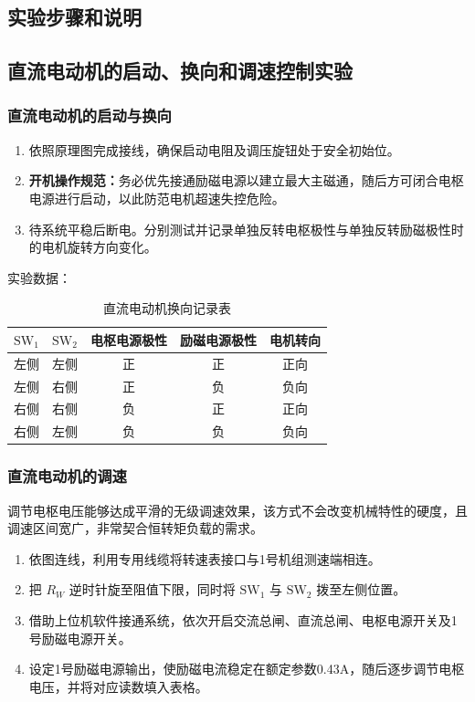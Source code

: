 \begin{framed}
{			\section{实验步骤和说明}
			
			\subsection{直流电动机的启动、换向和调速控制实验}
			
			\subsubsection{直流电动机的启动与换向}
			\begin{enumerate}
				\item 依照原理图完成接线，确保启动电阻及调压旋钮处于安全初始位。
				\item \textbf{开机操作规范：}务必优先接通励磁电源以建立最大主磁通，随后方可闭合电枢电源进行启动，以此防范电机超速失控危险。
				\item 待系统平稳后断电。分别测试并记录单独反转电枢极性与单独反转励磁极性时的电机旋转方向变化。
			\end{enumerate}
			
			实验数据：
			\begin{table}[H]
				\centering
				\caption{\hspace{0.5em}直流电动机换向记录表}
				\begin{tabular}{ccccc}
					\toprule
					$\text{SW}_1$ & $\text{SW}_2$ & 电枢电源极性 & 励磁电源极性 & 电机转向 \\
					\midrule
					左侧 & 左侧 & 正 & 正 & 正向 \\
					左侧 & 右侧 & 正 & 负 & 负向 \\
					右侧 & 右侧 & 负 & 正 & 正向 \\
					右侧 & 左侧 & 负 & 负 & 负向 \\
					\bottomrule
				\end{tabular}
			\end{table}
			
			\subsubsection{直流电动机的调速}
			调节电枢电压能够达成平滑的无级调速效果，该方式不会改变机械特性的硬度，且调速区间宽广，非常契合恒转矩负载的需求。
			\begin{enumerate}
				\item 依图连线，利用专用线缆将转速表接口与1号机组测速端相连。
				\item 把 $R_W$ 逆时针旋至阻值下限，同时将 $\text{SW}_1$ 与 $\text{SW}_2$ 拨至左侧位置。
				\item 借助上位机软件接通系统，依次开启交流总闸、直流总闸、电枢电源开关及1号励磁电源开关。
				\item 设定1号励磁电源输出，使励磁电流稳定在额定参数0.43A，随后逐步调节电枢电压，并将对应读数填入表格。
			\end{enumerate}
			
}
\end{framed}

